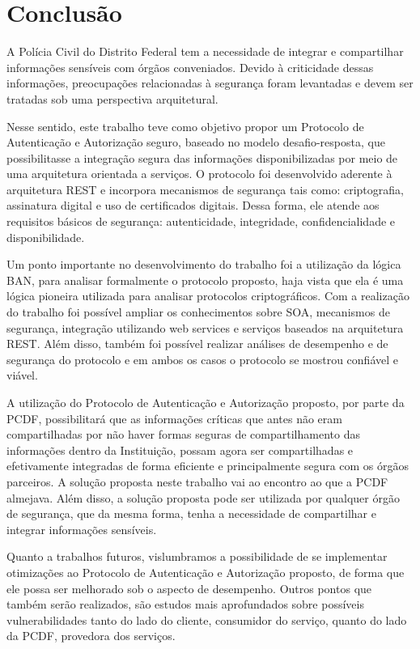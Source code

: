 \chapter{Conclusão}%

A Polícia Civil do Distrito Federal tem a necessidade de integrar e compartilhar informações sensíveis com órgãos conveniados. Devido à criticidade dessas informações, preocupações relacionadas à segurança foram levantadas e devem ser tratadas sob uma perspectiva arquitetural.

Nesse sentido, este trabalho teve como objetivo propor um Protocolo de Autenticação e Autorização seguro, baseado no modelo desafio-resposta, que possibilitasse a integração segura das informações disponibilizadas por meio de uma arquitetura orientada a serviços. O protocolo foi desenvolvido aderente à arquitetura REST e incorpora mecanismos de segurança tais como: criptografia, assinatura digital e uso de certificados digitais. Dessa forma, ele atende aos requisitos básicos de segurança: autenticidade, integridade, confidencialidade e disponibilidade.

Um ponto importante no desenvolvimento do trabalho foi a utilização da lógica BAN, para analisar formalmente o  protocolo proposto, haja vista que ela é uma lógica pioneira utilizada para analisar protocolos criptográficos. Com a realização do trabalho foi possível ampliar os conhecimentos sobre SOA, mecanismos de segurança, integração utilizando web services e serviços baseados na arquitetura REST. Além disso, também foi possível realizar análises de desempenho e de segurança do protocolo e em ambos os casos o protocolo se mostrou confiável e viável.

A utilização do Protocolo de Autenticação e Autorização proposto, por parte da PCDF, possibilitará que as informações críticas que antes não eram compartilhadas por não haver formas seguras de compartilhamento das informações dentro da Instituição, possam agora ser compartilhadas e efetivamente integradas de forma eficiente e principalmente segura com os órgãos parceiros. A solução proposta neste trabalho vai ao encontro ao que a PCDF almejava. Além disso, a solução proposta pode ser utilizada por qualquer órgão de segurança, que da mesma forma, tenha a necessidade de compartilhar e integrar informações sensíveis.

Quanto a trabalhos futuros, vislumbramos a possibilidade de se implementar otimizações ao Protocolo de Autenticação e Autorização proposto, de forma que ele possa ser melhorado sob o aspecto de desempenho. Outros pontos que também serão realizados, são estudos mais aprofundados sobre possíveis vulnerabilidades tanto do lado do cliente, consumidor do serviço,  quanto do lado da PCDF, provedora dos serviços.
